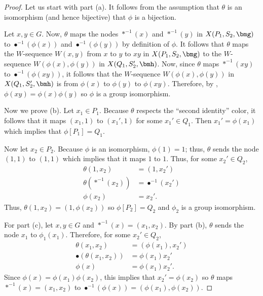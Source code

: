 \begin{proof}
  Let us start with part (a).  It follows from the assumption that $\theta$ is an isomorphism (and hence bijective) that $\phi$ is a bijection.

  Let $x, y \in G$.  Now, $\theta$ maps the nodes $*^{-1}(x)$ and $*^{-1}(y)$ in $X(P_1, S_2, \bmg)$ to $\bullet^{-1}(\phi(x))$ and $\bullet^{-1}(\phi(y))$ by definition of $\phi$.  It follows that $\theta$ maps the $W$-sequence $W(x, y)$ from $x$ to $y$ to $xy$ in $X(P_1, S_2, \bmg)$ to the $W$-sequence $W(\phi(x), \phi(y))$ in $X(Q_1, S_2', \bmh)$.  Now, since $\theta$ maps $*^{-1}(xy)$ to $\bullet^{-1}(\phi(xy))$, it follows that the $W$-sequence $W(\phi(x), \phi(y))$ in $X(Q_1, S_2', \bmh)$ is from $\phi(x)$ to $\phi(y)$ to $\phi(xy)$.  Therefore, by , $\phi(x y) = \phi(x) \phi(y)$ so $\phi$ is a group isomorphism.



  Now we prove (b).  Let $x_1 \in P_1$.  Because $\theta$ respects the ``second identity'' color, it follows that it maps $(x_1, 1)$ to $(x_1', 1)$ for some $x_1' \in Q_1$.  Then $x_1' = \phi(x_1)$ which implies that $\phi[P_1] = Q_1$.

  Now let $x_2 \in P_2$.  Because $\phi$ is an isomorphism, $\phi(1) = 1$; thus, $\theta$ sends the node $(1, 1)$ to $(1, 1)$ which implies that it maps $1$ to $1$.  Thus, for some $x_2' \in Q_2$,
  \begin{align*}
    \theta(1, x_2)      & = (1, x_2') \\
    \theta(*^{-1}(x_2)) & = \bullet^{-1}(x_2') \\
    \phi(x_2)           & = x_2'.
  \end{align*}
  Thus, $\theta(1, x_2) = (1, \phi(x_2))$ so $\phi[P_2] = Q_2$ and $\phi_2$ is a group isomorphism.

  For part (c), let $x, y \in G$ and $*^{-1}(x) = (x_1, x_2)$.  By part (b), $\theta$ sends the node $x_1$ to $\phi_1(x_1)$.  Therefore, for some $x_2' \in Q_2$,
  \begin{align*}
    \theta(x_1, x_2)          & = (\phi(x_1), x_2') \\
    \bullet(\theta(x_1, x_2)) & = \phi(x_1) x_2' \\
    \phi(x)                   & = \phi(x_1) x_2'.
  \end{align*}
  Since $\phi(x) = \phi(x_1) \phi(x_2)$, this implies that $x_2' = \phi(x_2)$ so $\theta$ maps $*^{-1}(x) = (x_1, x_2)$ to $\bullet^{-1}(\phi(x)) = (\phi(x_1), \phi(x_2))$.
  

\end{proof}
